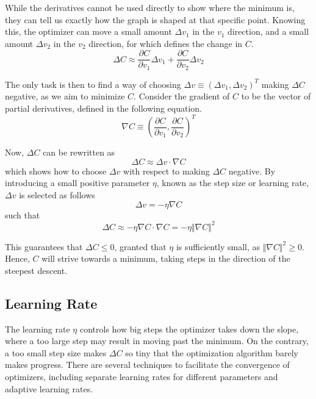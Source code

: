     While the derivatives cannot be used directly to show where the minimum is, they can tell us exactly how the graph is shaped at that specific point. 
    Knowing this, the optimizer can move a small amount $\Delta v_1$ in the $v_1$ direction, and a small amount $\Delta v_2$ in the $v_2$ direction, for which  defines the change in $C$.
    \begin{equation}\label{eq:mopt-DeltaC}
        \Delta C \approx \frac{\partial C}{\partial v_1}\Delta v_1 + \frac{\partial C}{\partial v_2} \Delta v_2
    \end{equation}
    
    The only task is then to find a way of choosing $\Delta v\equiv (\Delta v_1, \Delta v_2)^T$ making $\Delta C$ negative, as we aim to minimize $C$. Consider the gradient of $C$ to be the vector of partial derivatives, defined in the following equation.
    \begin{equation}\label{eq:mopt-gradient}
        \nabla C \equiv \left(\frac{\partial C}{\partial v_1}, \frac{\partial C}{\partial v_2}\right)^T
    \end{equation}
    
    Now, $\Delta C$ can be rewritten as
    \begin{equation}\label{eq:mopt-DeltaC-gradient}
        \Delta C \approx \Delta v \cdot \nabla C
    \end{equation}
    which shows how to choose $\Delta v$ with respect to making $\Delta C$ negative. By introducing a small positive parameter $\eta$, known as the step size or learning rate, $\Delta v$ is selected as follows
    \begin{equation}
        \Delta v = -\eta \nabla C
    \end{equation}
    such that 
    \begin{equation}
        \Delta C \approx -\eta \nabla C \cdot \nabla C = -\eta \Vert\nabla C\Vert^2
    \end{equation}
    
    This guarantees that $\Delta C \leq 0$, granted that $\eta$ is sufficiently small, as $\Vert\nabla C\Vert^2 \geq 0$. Hence, $C$ will strive towards a minimum, taking steps in the direction of the steepest descent.
    
    \subsection{Learning Rate}
    
        The learning rate $\eta$ controls how big steps the optimizer takes down the slope, where a too large step may result in moving past the minimum. On the contrary, a too small step size makes $\Delta C$ so tiny that the optimization algorithm barely makes progress. There are several techniques to facilitate the convergence of optimizers, including separate learning rates for different parameters and adaptive learning rates.
        
